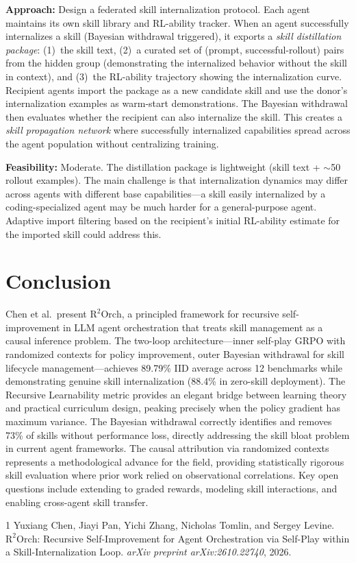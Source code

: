 \documentclass[11pt,a4paper]{article}
\begin{document}
\textbf{Approach:} Design a federated skill internalization protocol. Each agent maintains its own skill library and RL-ability tracker. When an agent successfully internalizes a skill (Bayesian withdrawal triggered), it exports a \emph{skill distillation package}: (1)~the skill text, (2)~a curated set of (prompt, successful-rollout) pairs from the hidden group (demonstrating the internalized behavior without the skill in context), and (3)~the RL-ability trajectory showing the internalization curve. Recipient agents import the package as a new candidate skill and use the donor's internalization examples as warm-start demonstrations. The Bayesian withdrawal then evaluates whether the recipient can also internalize the skill. This creates a \emph{skill propagation network} where successfully internalized capabilities spread across the agent population without centralizing training.

\textbf{Feasibility:} Moderate. The distillation package is lightweight (skill text + ${\sim}$50 rollout examples). The main challenge is that internalization dynamics may differ across agents with different base capabilities---a skill easily internalized by a coding-specialized agent may be much harder for a general-purpose agent. Adaptive import filtering based on the recipient's initial RL-ability estimate for the imported skill could address this.

\section{Conclusion}
Chen et al.\ present $\mathrm{R^2Orch}$, a principled framework for recursive self-improvement in LLM agent orchestration that treats skill management as a causal inference problem. The two-loop architecture---inner self-play GRPO with randomized contexts for policy improvement, outer Bayesian withdrawal for skill lifecycle management---achieves 89.79\% IID average across 12 benchmarks while demonstrating genuine skill internalization (88.4\% in zero-skill deployment). The Recursive Learnability metric provides an elegant bridge between learning theory and practical curriculum design, peaking precisely when the policy gradient has maximum variance. The Bayesian withdrawal correctly identifies and removes 73\% of skills without performance loss, directly addressing the skill bloat problem in current agent frameworks. The causal attribution via randomized contexts represents a methodological advance for the field, providing statistically rigorous skill evaluation where prior work relied on observational correlations. Key open questions include extending to graded rewards, modeling skill interactions, and enabling cross-agent skill transfer.


\begin{thebibliography}{1}
Yuxiang Chen, Jiayi Pan, Yichi Zhang, Nicholas Tomlin, and Sergey Levine.
\newblock $\mathrm{R^2Orch}$: Recursive Self-Improvement for Agent Orchestration via Self-Play within a Skill-Internalization Loop.
\newblock \emph{arXiv preprint arXiv:2610.22740}, 2026.
\end{thebibliography}
\end{document}
